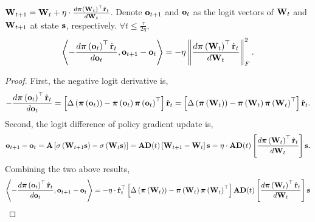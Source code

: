 \begin{lem}
\label{lem:inner_product_logit_difference_logit_derivative}
    ${\mathbf{W}}_{t+1} = {\mathbf{W}}_t + \eta \cdot \frac{d {\boldsymbol{\pi}}\left({\mathbf{W}}_t\right)^\top \hat{{\mathbf{r}}}_t}{d {\mathbf{W}}_t}$. Denote ${\mathbf{o}}_{t+1}$ and ${\mathbf{o}}_t$ as the logit vectors of ${\mathbf{W}}_t$ and ${\mathbf{W}}_{t+1}$ at state ${\mathbf{s}}$, respectively. $\forall t \le \frac{\tau}{ 2 \eta }$,
\begin{equation*}
\begin{split}
    \left\langle - \frac{d {\boldsymbol{\pi}}\left( {\mathbf{o}}_t \right)^\top \hat{{\mathbf{r}}}_t}{d {\mathbf{o}}_t}, {\mathbf{o}}_{t+1} - {\mathbf{o}}_t \right\rangle = - \eta \left\| \frac{d {\boldsymbol{\pi}}\left({\mathbf{W}}_t\right)^\top \hat{{\mathbf{r}}}_t}{d {\mathbf{W}}_t} \right\|_F^2.
\end{split}
\end{equation*}
\end{lem}
\begin{proof}
    First, the negative logit derivative is,
\begin{equation*}
\begin{split}
    - \frac{d {\boldsymbol{\pi}}\left( {\mathbf{o}}_t \right)^\top \hat{{\mathbf{r}}}_t}{d {\mathbf{o}}_t} = \left[\Delta\left( {\boldsymbol{\pi}}\left( {\mathbf{o}}_t \right) \right) - {\boldsymbol{\pi}}\left( {\mathbf{o}}_t \right) {\boldsymbol{\pi}}\left( {\mathbf{o}}_t \right)^\top \right] \hat{{\mathbf{r}}}_t = \left[\Delta\left( {\boldsymbol{\pi}}\left( {\mathbf{W}}_t \right) \right) - {\boldsymbol{\pi}}\left( {\mathbf{W}}_t \right) {\boldsymbol{\pi}}\left( {\mathbf{W}}_t \right)^\top \right] \hat{{\mathbf{r}}}_t.
\end{split}
\end{equation*}
Second, the logit difference of policy gradient update is,
\begin{equation*}
\begin{split}
    {\mathbf{o}}_{t+1} - {\mathbf{o}}_t = {\mathbf{A}} \left[ \sigma\left({\mathbf{W}}_{t+1} {\mathbf{s}} \right) - \sigma\left( {\mathbf{W}}_t {\mathbf{s}} \right)\right] = {\mathbf{A}} {\mathbf{D}}(t) \left[ {\mathbf{W}}_{t+1} - {\mathbf{W}}_t \right] {\mathbf{s}} = \eta \cdot {\mathbf{A}} {\mathbf{D}}(t) \left[ \frac{d {\boldsymbol{\pi}}\left({\mathbf{W}}_t\right)^\top \hat{{\mathbf{r}}}_t}{d {\mathbf{W}}_t} \right] {\mathbf{s}}.
\end{split}
\end{equation*}
Combining the two above results,
\begin{equation*}
\begin{split}
    \left\langle - \frac{d \rvpi\left( \rvo_t \right)^\top \hat{\rvr}_t}{d \rvo_t}, \rvo_{t+1} - \rvo_t \right\rangle &= - \eta \cdot \hat{\rvr}_t^\top \left[\Delta\left( \rvpi\left( \rmW_t \right) \right) - \rvpi\left( \rmW_t \right) \rvpi\left( \rmW_t \right)^\top \right] \rmA \rmD(t) \left[ \frac{d \rvpi\left(\rmW_t\right)^\top \hat{\rvr}_t}{d \rmW_t} \right] \rvs \\

\end{split}
\end{equation*}
\end{proof}
